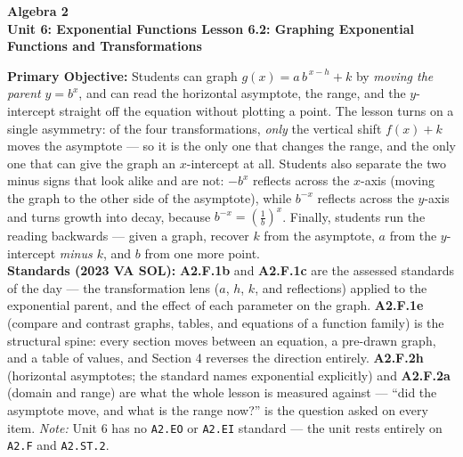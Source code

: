 \documentclass[10pt]{article}
\newcommand{\CourseName}{Algebra 2}
\newcommand{\UnitNumberName}{Unit 6: Exponential Functions \quad}
\newcommand{\LessonNumberName}{Lesson 6.2: Graphing Exponential Functions and Transformations}
\begin{document}
\begin{center}
    {\Large\bfseries \CourseName \\
    {\small\bfseries \UnitNumberName \LessonNumberName}}
\end{center}

\begin{tcolorbox}[colback=forestbg, colframe=forest, boxrule=0.9pt, arc=2mm,
    left=2mm, right=2mm, top=1.5mm, bottom=1.5mm]
    \textbf{Primary Objective:} Students can graph $g(x)=a\,b^{\,x-h}+k$ by \emph{moving the parent}
    $y=b^{x}$, and can read the horizontal asymptote, the range, and the $y$-intercept straight off
    the equation without plotting a point. The lesson turns on a single asymmetry: of the four
    transformations, \emph{only} the vertical shift $f(x)+k$ moves the asymptote --- so it is the only
    one that changes the range, and the only one that can give the graph an $x$-intercept at all.
    Students also separate the two minus signs that look alike and are not: $-b^{x}$ reflects across
    the $x$-axis (moving the graph to the other side of the asymptote), while $b^{-x}$ reflects
    across the $y$-axis and turns growth into decay, because $b^{-x}=\left(\frac1b\right)^{x}$.
    Finally, students run the reading backwards --- given a graph, recover $k$ from the asymptote, $a$
    from the $y$-intercept \emph{minus $k$}, and $b$ from one more point.
    \\[2pt]
    \textbf{Standards (2023 VA SOL):} \textbf{A2.F.1b} and \textbf{A2.F.1c} are the assessed standards
    of the day --- the transformation lens ($a$, $h$, $k$, and reflections) applied to the exponential
    parent, and the effect of each parameter on the graph. \textbf{A2.F.1e} (compare and contrast
    graphs, tables, and equations of a function family) is the structural spine: every section moves
    between an equation, a pre-drawn graph, and a table of values, and Section 4 reverses the
    direction entirely. \textbf{A2.F.2h} (horizontal asymptotes; the standard names exponential
    explicitly) and \textbf{A2.F.2a} (domain and range) are what the whole lesson is measured
    against --- ``did the asymptote move, and what is the range now?'' is the question asked on every
    item. \emph{Note:} Unit 6 has no \texttt{A2.EO} or \texttt{A2.EI} standard --- the unit rests
    entirely on \texttt{A2.F} and \texttt{A2.ST.2}.
\end{tcolorbox}
\end{document}
